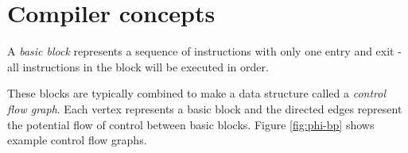 % 
%
% 
% 
% 
% 
% 
% 

\section{Compiler concepts}

A \emph{basic block} represents a sequence of instructions with only one entry and exit - all
instructions
in the block will be executed in order.

These blocks are typically combined to make a data structure called a \emph{control flow graph}.
Each vertex represents a basic block and the directed edges represent the potential flow of
control between basic blocks. Figure \ref{fig:phi-bp} shows example control flow graphs.

